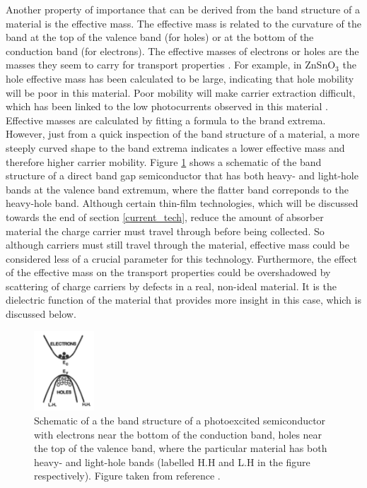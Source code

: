 Another property of importance that can be derived from the band structure of a material is the effective mass. The effective mass is related to the curvature of the band at the top of the valence band (for holes) or at the bottom of the conduction band (for electrons). The effective masses of electrons or holes are the masses they seem to carry for transport properties \cite{dielectric_const1}. For example, in ZnSnO$_3$ the hole effective mass has been calculated to be large, indicating that hole mobility will be poor in this material. Poor mobility will make carrier extraction difficult, which has been linked to the low photocurrents observed in this material \cite{effective_mass1}. Effective masses are calculated by fitting a formula to the brand extrema. However, just from a quick inspection of the band structure of a material, a more steeply curved shape to the band extrema indicates a lower effective mass and therefore higher carrier mobility. Figure \ref{heavy_holes} shows a schematic of the band structure of a direct band gap semiconductor that has both heavy- and light-hole bands at the valence band extremum, where the flatter band correponds to the heavy-hole band.
Although certain thin-film technologies, which will be discussed towards the end of section \ref{current_tech}, reduce the amount of absorber material the charge carrier must travel through before being collected. So although carriers must still travel through the material, effective mass could be considered less of a crucial parameter for this technology. Furthermore, the effect of the effective mass on the transport properties could be overshadowed by scattering of charge carriers by defects in a real, non-ideal material. It is the dielectric function of the material that provides more insight in this case, which is discussed below.

\begin{figure}[h!]
  \centering
    \includegraphics[width=0.2\textwidth]{figures/heavy_holes.png}
    \caption{Schematic of a the band structure of a photoexcited semiconductor with electrons near the bottom of the conduction band, holes near the top of the valence band, where the particular material has both heavy- and light-hole bands (labelled H.H and L.H in the figure respectively). Figure taken from reference .}
  \label{heavy_holes}
\end{figure}


